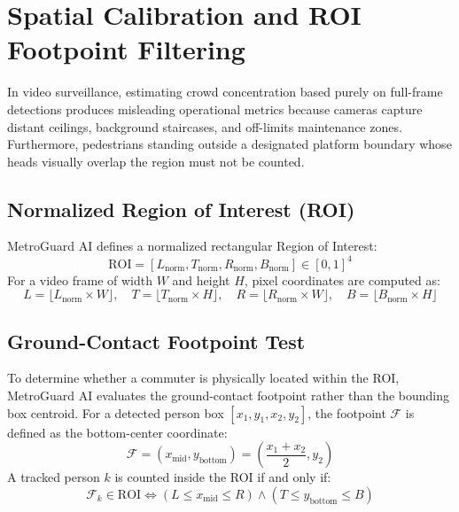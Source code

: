 \documentclass[12pt,a4paper]{report}
\begin{document}
\section{Spatial Calibration and ROI Footpoint Filtering}
In video surveillance, estimating crowd concentration based purely on full-frame detections produces misleading operational metrics because cameras capture distant ceilings, background staircases, and off-limits maintenance zones. Furthermore, pedestrians standing outside a designated platform boundary whose heads visually overlap the region must not be counted.

\subsection{Normalized Region of Interest (ROI)}
MetroGuard AI defines a normalized rectangular Region of Interest:
\begin{equation}
    \text{ROI} = [L_{\text{norm}}, T_{\text{norm}}, R_{\text{norm}}, B_{\text{norm}}] \in [0, 1]^4
\end{equation}
For a video frame of width $W$ and height $H$, pixel coordinates are computed as:
\begin{equation}
    L = \lfloor L_{\text{norm}} \times W \rfloor, \quad T = \lfloor T_{\text{norm}} \times H \rfloor, \quad R = \lfloor R_{\text{norm}} \times W \rfloor, \quad B = \lfloor B_{\text{norm}} \times H \rfloor
\end{equation}

\subsection{Ground-Contact Footpoint Test}
To determine whether a commuter is physically located within the ROI, MetroGuard AI evaluates the ground-contact footpoint rather than the bounding box centroid. For a detected person box $[x_1, y_1, x_2, y_2]$, the footpoint $\mathcal{F}$ is defined as the bottom-center coordinate:
\begin{equation}
    \mathcal{F} = \left( x_{\text{mid}}, y_{\text{bottom}} \right) = \left( \frac{x_1 + x_2}{2}, y_2 \right)
\end{equation}
A tracked person $k$ is counted inside the ROI if and only if:
\begin{equation}
    \mathcal{F}_k \in \text{ROI} \iff \left( L \le x_{\text{mid}} \le R \right) \land \left( T \le y_{\text{bottom}} \le B \right)
\end{equation}
\end{document}
